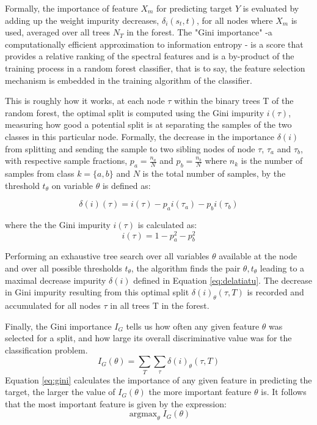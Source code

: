 \documentclass[preprint,12pt]{elsarticle}
\DeclareMathOperator*{\argmax}{argmax}
\begin{document}
Formally, the importance of feature $X_m$ for predicting target $Y$ is evaluated by adding up the weight impurity decreases, $\delta_i(s_t,t)$, for all nodes where $X_m$ is used, averaged over all trees $N_T$ in the forest.
The "Gini importance" -a computationally efficient approximation to information entropy \cite{cover2012elements}- is a score that provides a relative ranking of the spectral features and is a by-product of the training process in a random forest classifier, that is to say, the feature selection mechanism is embedded in the training algorithm of the classifier. 

This is roughly how it works, at each node $\tau$ within the binary trees T of the random forest, the optimal split is computed using the Gini impurity $i(\tau)$, measuring how good a potential split is at separating the samples of the two classes in this particular node. Formally, the decrease in the importance $\delta(i)$ from splitting and sending the sample to two sibling nodes of node $\tau$, $\tau_a$ and $\tau_b$, with respective sample fractions, $p_a=\frac{n_a}{N}$ and $p_b=\frac{n_b}{N}$ 
where $n_k$ is the number of samples from class $k =\{a,b\}$ and $N$ is the total number of samples, by the threshold $t_\theta$ on variable $\theta$ is defined as:

\begin{equation}
\delta(i)(\tau) = i(\tau) - p_{a}i(\tau_{a})- p_{b}i(\tau_{b})
\label{eq:delatiatu}
\end{equation}

where the the Gini impurity $i(\tau)$ is calculated as: 
\begin{equation}
i(\tau) = 1 -p_{a}^2 - p_{b}^2
\label{eq:iatu}
\end{equation}

Performing an exhaustive tree search over all variables $\theta$ available at the node  and over all possible thresholds $t_\theta$, the algorithm finds the pair $\theta, t_{\theta}$ leading to a maximal decrease impurity $\delta(i)$ defined in Equation \ref{eq:delatiatu}. The decrease in Gini impurity resulting from this optimal split $\delta(i)_{\theta}(\tau, T)$ is recorded and accumulated for all nodes $\tau$ in all trees T in the forest. 

Finally, the Gini importance $I_G$ tells us how often any given feature $\theta$ was selected for a split, and how large its overall discriminative value was for the classification problem. 
\begin{equation}
I_{G}(\theta) = \sum_T \sum_{\tau} \delta(i)_{\theta}(\tau,T)
\label{eq:gini}
\end{equation}
Equation \ref{eq:gini} calculates the importance of any given feature in predicting the target, the larger the value of $I_{G}(\theta)$ the more important feature $\theta$ is. It follows that the most important feature is given by the expression:
\begin{equation}
\argmax_{\theta} I_{G}(\theta)
\label{eq:argm}
\end{equation}
\end{document}
